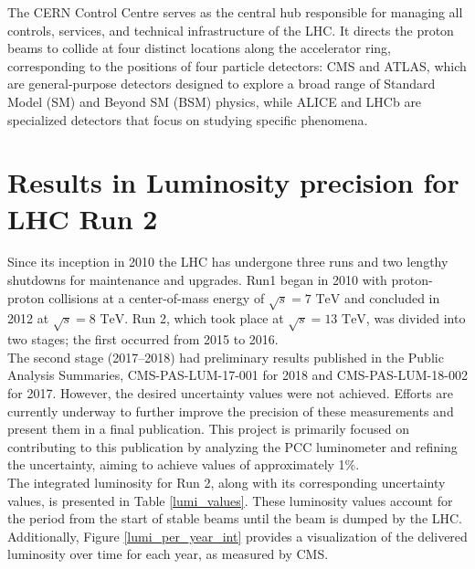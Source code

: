 The CERN Control Centre serves as the central hub responsible for managing all controls, services, and technical infrastructure of the LHC. It directs the proton beams to collide at four distinct locations along the accelerator ring, corresponding to the positions of four particle detectors: CMS and ATLAS, which are general-purpose detectors designed to explore a broad range of Standard Model (SM) and Beyond SM (BSM) physics, while ALICE and LHCb are specialized detectors that focus on studying specific phenomena.

\section{Results in Luminosity precision for LHC Run 2}

Since its inception in 2010 the LHC has undergone three runs and two lengthy shutdowns for maintenance and upgrades. 
Run1 began in 2010 with proton-proton collisions at a center-of-mass energy of $\sqrt{s}=\text{7 TeV}$ and concluded in 2012 at  $\sqrt{s}=\text{8 TeV}$. Run 2, which took place at $\sqrt{s}=\text{13 TeV}$, was divided into two stages; the first  occurred from 2015 to 2016.\\

The second stage (2017–2018) had preliminary results published in the Public Analysis Summaries, CMS-PAS-LUM-17-001 \cite{pas_17} for 2018 and CMS-PAS-LUM-18-002 \cite{pas_18} for 2017. However, the desired uncertainty values were not achieved.
Efforts are currently underway to further improve the precision of these measurements and present them in a final publication. This project is primarily focused on contributing to this publication by analyzing the PCC luminometer and refining the uncertainty, aiming to achieve values of approximately 1\%.\\

The integrated luminosity for Run 2, along with its corresponding uncertainty values, is presented in Table \ref{lumi_values}. These luminosity values account for the period from the start of stable beams until the beam is dumped by the LHC. Additionally, Figure \ref{lumi_per_year_int} provides a visualization of the delivered luminosity over time for each year, as measured by CMS.

